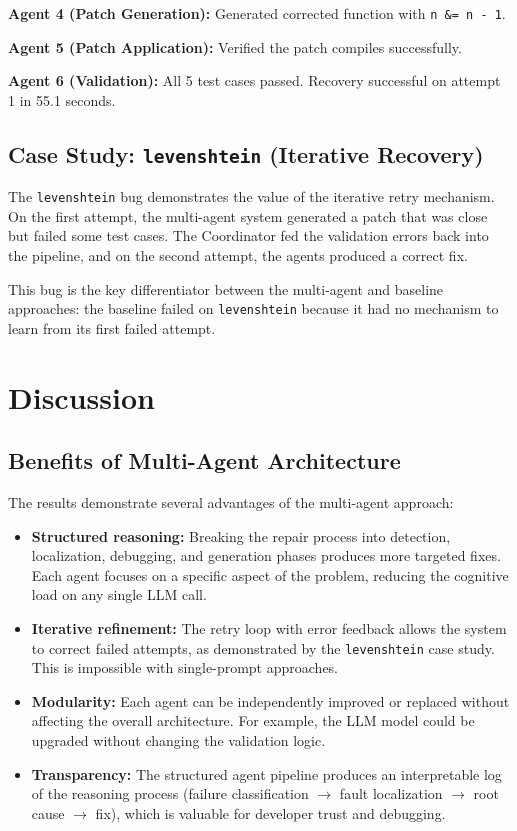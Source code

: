 \documentclass[conference]{IEEEtran}
\begin{document}
\textbf{Agent 4 (Patch Generation):} Generated corrected function with \texttt{n \&= n - 1}.

\textbf{Agent 5 (Patch Application):} Verified the patch compiles successfully.

\textbf{Agent 6 (Validation):} All 5 test cases passed. Recovery successful on attempt 1 in 55.1 seconds.

\subsection{Case Study: \texttt{levenshtein} (Iterative Recovery)}
The \texttt{levenshtein} bug demonstrates the value of the iterative retry mechanism. On the first attempt, the multi-agent system generated a patch that was close but failed some test cases. The Coordinator fed the validation errors back into the pipeline, and on the second attempt, the agents produced a correct fix.

This bug is the key differentiator between the multi-agent and baseline approaches: the baseline failed on \texttt{levenshtein} because it had no mechanism to learn from its first failed attempt.

\section{Discussion}

\subsection{Benefits of Multi-Agent Architecture}
The results demonstrate several advantages of the multi-agent approach:
\begin{itemize}
    \item \textbf{Structured reasoning:} Breaking the repair process into detection, localization, debugging, and generation phases produces more targeted fixes. Each agent focuses on a specific aspect of the problem, reducing the cognitive load on any single LLM call.
    \item \textbf{Iterative refinement:} The retry loop with error feedback allows the system to correct failed attempts, as demonstrated by the \texttt{levenshtein} case study. This is impossible with single-prompt approaches.
    \item \textbf{Modularity:} Each agent can be independently improved or replaced without affecting the overall architecture. For example, the LLM model could be upgraded without changing the validation logic.
    \item \textbf{Transparency:} The structured agent pipeline produces an interpretable log of the reasoning process (failure classification $\rightarrow$ fault localization $\rightarrow$ root cause $\rightarrow$ fix), which is valuable for developer trust and debugging.
\end{itemize}
\end{document}
